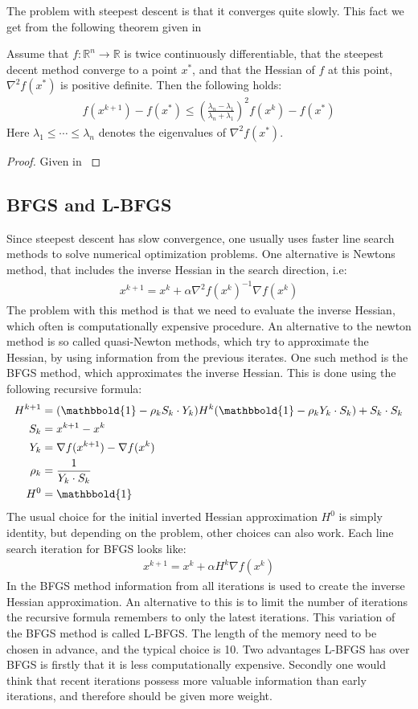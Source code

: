 The problem with steepest descent is that it converges quite slowly. This fact we get from the following theorem given in \cite{nocedal2006numerical}
\begin{theorem}
Assume that $f:\mathbb{R}^n\longrightarrow\mathbb{R}$ is twice continuously differentiable, that the steepest decent method converge to a point $x^*$, and that the Hessian of $f$ at this point, $\nabla^2 f(x^*)$ is positive definite. Then the following holds:
\begin{align*}
f(x^{k+1})-f(x^*) \leq (\frac{\lambda_n-\lambda_1}{\lambda_n+\lambda_1})^2 f(x^{k})-f(x^*)
\end{align*}  
Here $\lambda_1\leq\cdots\leq \lambda_n$ denotes the eigenvalues of $\nabla^2 f(x^*)$.
\end{theorem}   
\begin{proof}
Given in \cite{nocedal2006numerical}
\end{proof}
\subsection{BFGS and L-BFGS}
Since steepest descent has slow convergence, one usually uses faster line search methods to solve numerical optimization problems. One alternative is Newtons method, that includes the inverse Hessian in the search direction, i.e:
\begin{align*}
x^{k+1} = x^k + \alpha \nabla^2 f(x^k)^{-1}\nabla f(x^k)
\end{align*}
The problem with this method is that we need to evaluate the inverse Hessian, which often is computationally expensive procedure. An alternative to the newton method is so called quasi-Newton methods, which try to approximate the Hessian, by using information from the previous iterates. One such method is the BFGS method, which approximates the inverse Hessian. This is done using the following recursive formula:
\begin{align*}
H^{k+1} &= (\mathbbold{1}-\rho_kS_k\cdot Y_k)H^k(\mathbbold{1} -\rho_kY_k\cdot S_k) + S_k\cdot S_k \\
S_k &= x^{k+1}-x^{k} \\
Y_k &= \nabla f(x^{k+1})-\nabla f(x^{k})\\
\rho_k &= \frac{1}{Y_k\cdot S_k} \\
H^0&=\mathbbold{1}
\end{align*}
The usual choice for the initial inverted Hessian approximation $H^0$ is simply identity, but depending on the problem, other choices can also work. Each line search iteration for BFGS looks like:
\begin{align*}
x^{k+1} = x^k + \alpha H^{k}\nabla f(x^k)
\end{align*} 
In the BFGS method information from all iterations is used to create the inverse Hessian approximation. An alternative to this is to limit the number of iterations the recursive formula remembers to only the latest iterations. This variation of the BFGS method is called L-BFGS. The length of the memory need to be chosen in advance, and the typical choice is 10. Two advantages L-BFGS has over BFGS is firstly that it is less computationally expensive. Secondly one would think that recent iterations possess more valuable information than early iterations, and therefore should be given more weight. 
